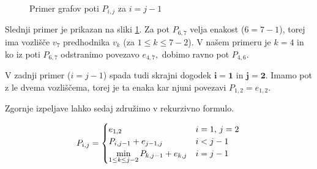 \documentclass[12pt,a4paper]{amsart}
\theoremstyle{definition}
\theoremstyle{plain}
\begin{document}
\begin{figure}[!htb]%
  \centering
  \qquad
  \caption{Primer grafov poti $P_{i,j} $ za $i = j - 1$}%
  \label{slika:2. primer}%
\end{figure}

\noindent
Slednji primer je prikazan na sliki \ref{slika:2. primer}. Za pot $P_{6,7}$ velja enakost ($6 = 7 - 1$), 
torej ima vozlišče $v_7$ predhodnika $v_k$ (za $1 \leq k \leq 7 - 2$). V našem primeru je $k = 4$ in ko 
iz poti $P_{6,7}$ odstranimo povezavo $e_{4,7},$ dobimo ravno pot $P_{4,6}.$
\newline

\noindent
V zadnji primer ($i = j - 1$) spada tudi skrajni dogodek $\bm{i = 1}$ in $\bm{j = 2}$. Imamo pot z le dvema
vozliščema, torej je ta enaka kar njuni povezavi $P_{1,2} = e_{1,2}.$
\newline

\noindent
Zgornje izpeljave lahko sedaj združimo v rekurzivno formulo.


\begin{equation*}
    P_{i,j} =
      \begin{cases}
        e_{1, 2} & \text{$i = 1$, $j = 2$}\\
        P_{i, j-1} + e_{j-1, j} & \text{$i < j - 1$}\\
        \displaystyle \min_{1 \leq k \leq j - 2} P_{k, j-1} + e_{k, j} & \text{$i = j - 1$}
      \end{cases}   
      \newline      
  \end{equation*}
\end{document}
